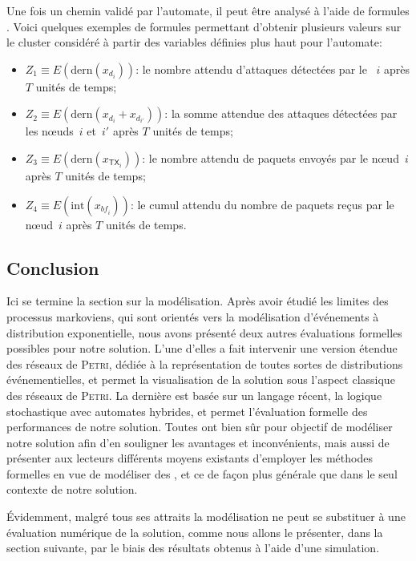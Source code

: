 Une fois un chemin validé par l'automate, il peut être analysé à l'aide de formules \lsah.
Voici quelques exemples de formules \lsah permettant d'obtenir plusieurs valeurs sur le cluster considéré à partir des variables définies plus haut pour l'automate:
\begin{itemize}
    \item $Z_1\equiv E(\mbox{dern}(x_{d_i}))$: le nombre attendu d'attaques détectées par le \cn~$i$ après $T$ unités de temps;
    \item $Z_2\equiv E(\mbox{dern}(x_{d_i}+x_{d_{i'}}))$: la somme attendue des attaques détectées par les nœuds~$i$ et~$i'$ après $T$ unités de temps;
    \item $Z_3\equiv E(\mbox{dern}(x_{\mathsf{TX}_i}))$: le nombre attendu de paquets envoyés par le nœud~$i$ après $T$ unités de temps;
    \item $Z_4\equiv E(\mbox{int}(x_{\mathit{bf}_i}))$: le cumul attendu du nombre de paquets reçus par le nœud~$i$ après $T$ unités de temps.
\end{itemize}

    \subsection{Conclusion}

Ici se termine la section sur la modélisation.
Après avoir étudié les limites des processus markoviens, qui sont orientés vers la modélisation d'événements à distribution exponentielle, nous avons présenté deux autres évaluations formelles possibles pour notre solution.
L'une d'elles a fait intervenir une version étendue des réseaux de \textsc{Petri}, dédiée à la représentation de toutes sortes de distributions événementielles, et permet la visualisation de la solution sous l'aspect classique des réseaux de \textsc{Petri}.
La dernière est basée sur un langage récent, la logique stochastique avec automates hybrides, et permet l'évaluation formelle des performances de notre solution.
Toutes ont bien sûr pour objectif de modéliser notre solution afin d'en souligner les avantages et inconvénients, mais aussi de présenter aux lecteurs différents moyens existants d'employer les méthodes formelles en vue de modéliser des \rcs, et ce de façon plus générale que dans le seul contexte de notre solution.

Évidemment, malgré tous ses attraits la modélisation ne peut se substituer à une évaluation numérique de la solution, comme nous allons le présenter, dans la section suivante, par le biais des résultats obtenus à l'aide d'une simulation.
